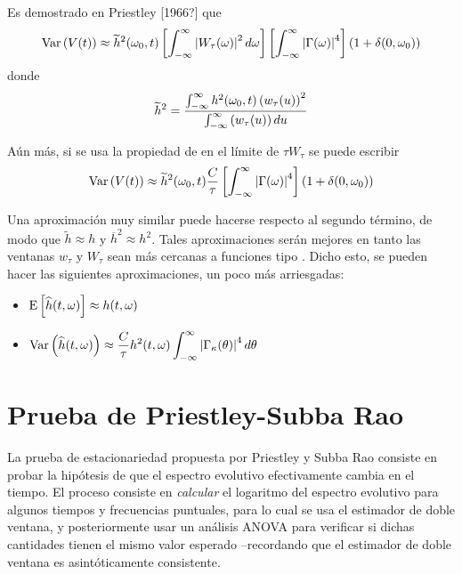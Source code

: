 Es demostrado en Priestley [1966?] que
\begin{equation}
\mathrm{Var}\left( V(t) \right) \approx \widetilde{h}^{2}(\omega_0,t) \left[ \int_{-\infty}^{\infty} \left| W_\tau(\omega) \right|^{2} d\omega \right] \left[ \int_{-\infty}^{\infty} \left| \Gamma(\omega) \right|^{4} \right] (1+\delta(0,\omega_0))
\end{equation}
donde
\begin{equation}
\widetilde{h}^{2} = \frac{\int_{-\infty}^{\infty} h^{2}(\omega_0,t) \left(w_\tau(u)\right)^{2}}{\int_{-\infty}^{\infty} \left(w_\tau(u)\right) du}
\end{equation}

Aún más, si se usa la propiedad de en el límite de $\tau W_\tau$ se puede escribir
\begin{equation}
\mathrm{Var}\left( V(t) \right) \approx 
\widetilde{h}^{2}(\omega_0,t) \frac{C}{\tau} \left[ \int_{-\infty}^{\infty} \left| \Gamma(\omega) \right|^{4} \right] (1+\delta(0,\omega_0))
\end{equation}

Una aproximación muy similar 
puede hacerse respecto al segundo término, de modo que $\widetilde{h}\approx h$ y 
$\overline{h}^{2}\approx h^{2}$.
Tales aproximaciones serán mejores en tanto las ventanas $w_{\tau}$ y $W_{\tau}$ sean más 
cercanas a funciones tipo \dirac.
Dicho esto, se pueden hacer las siguientes aproximaciones, un poco más arriesgadas:
\begin{itemize}
\item $\displaystyle \mathrm{E}\left[ \widehat{ h }(t,\omega) \right] \approx h(t,\omega)$
\item $\displaystyle \mathrm{Var}\left( \widehat{ h }(t,\omega) \right) \approx 
\frac{C}{\tau} h^{2}(t,\omega) \int_{-\infty}^{\infty} \left| \Gamma_\kappa (\theta) \right|^{4} d\theta$
\end{itemize}


\section{Prueba de Priestley-Subba Rao}
\label{sec:psr}

La prueba de estacionariedad propuesta por Priestley y Subba Rao \cite{Priestley69} consiste en 
probar la hipótesis de que el espectro evolutivo efectivamente cambia en el tiempo. 
%
El proceso consiste en \textit{calcular} el logaritmo del espectro evolutivo para algunos tiempos y 
frecuencias puntuales, para lo cual se usa el estimador de doble ventana, y posteriormente usar un
análisis ANOVA para verificar si dichas cantidades tienen el mismo valor esperado --recordando que
el estimador de doble ventana es asintóticamente consistente.

